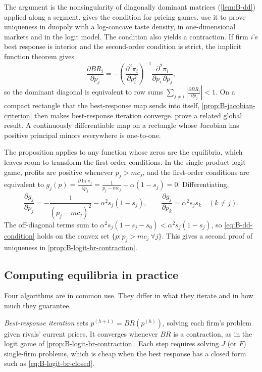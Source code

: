 The argument is the nonsingularity of diagonally dominant matrices (\cref{lem:B-dd}) applied along a segment.
\citet{Friedman1977} gives the condition for pricing games. \citet{CaplinNalebuff1991} use it to prove
uniqueness in duopoly with a log-concave taste density, in one-dimensional markets and in the logit model.
The condition also yields a contraction. If firm $i$'s best response is interior and the second-order
condition is strict, the implicit function theorem gives
\begin{equation*}
  \frac{\partial BR_i}{\partial p_j} = -\left(\frac{\partial^2\pi_i}{\partial p_i^2}\right)^{-1}
  \frac{\partial^2\pi_i}{\partial p_i\,\partial p_j},
\end{equation*}
so the dominant diagonal is equivalent to row sums $\sum_{j \neq i}|\frac{\partial BR_i}{\partial p_j}| < 1$.
On a compact rectangle that the best-response map sends into itself, \cref{prop:B-jacobian-criterion} then
makes best-response iteration converge. \citet{GaleNikaido1965} prove a related global result. A
continuously differentiable map on a rectangle whose Jacobian has positive principal minors everywhere is
one-to-one.

The proposition applies to any function whose zeros are the equilibria, which leaves room to transform the
first-order conditions. In the single-product logit game, profits are positive whenever $p_j > mc_j$, and the
first-order conditions are equivalent to $g_j(p) = \frac{\partial\ln\pi_j}{\partial p_j} = \frac{1}{p_j -
mc_j} - \alpha(1 - s_j) = 0$. Differentiating,
\begin{equation*}
  \frac{\partial g_j}{\partial p_j} = -\frac{1}{(p_j - mc_j)^2} - \alpha^2s_j(1 - s_j), \qquad
  \frac{\partial g_j}{\partial p_k} = \alpha^2s_js_k \quad (k \neq j).
\end{equation*}
The off-diagonal terms sum to $\alpha^2s_j(1 - s_j - s_0) < \alpha^2s_j(1 - s_j)$, so \eqref{eq:B-dd-condition}
holds on the convex set $\{p : p_j > mc_j \ \forall j\}$. This gives a second proof of uniqueness in
\cref{prop:B-logit-br-contraction}.

\subsection{Computing equilibria in practice}\label{sec:B-fp-computation}

Four algorithms are in common use. They differ in what they iterate and in how much they guarantee.

\emph{Best-response iteration} sets $p^{(h+1)} = BR(p^{(h)})$, solving each firm's problem given rivals'
current prices. It converges whenever $BR$ is a contraction, as in the logit game of
\cref{prop:B-logit-br-contraction}. Each step requires solving $J$ (or $F$) single-firm problems, which is
cheap when the best response has a closed form such as \eqref{eq:B-logit-br-closed}.

